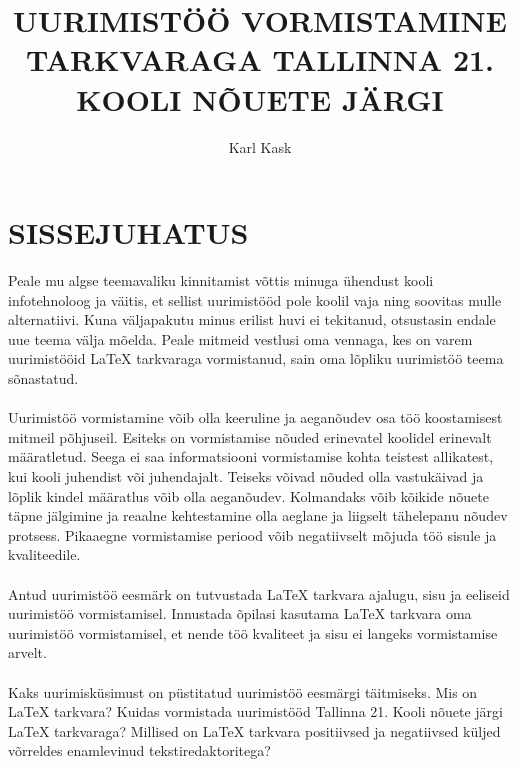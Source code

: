 \documentclass{21kuur}
\title{UURIMISTÖÖ VORMISTAMINE \latex TARKVARAGA TALLINNA 21. KOOLI NÕUETE JÄRGI}
\author{Karl Kask}
\begin{document}
\maketitle
\tableofcontents

\newpage
\chapter*{SISSEJUHATUS}
Peale mu algse teemavaliku kinnitamist võttis minuga ühendust kooli infotehnoloog ja väitis, et sellist uurimistööd pole koolil vaja ning soovitas mulle alternatiivi. Kuna väljapakutu minus erilist huvi ei tekitanud, otsustasin endale uue teema välja mõelda. Peale mitmeid vestlusi oma vennaga, kes on varem uurimistööid LaTeX tarkvaraga vormistanud, sain oma lõpliku uurimistöö teema sõnastatud.
\\\\Uurimistöö vormistamine võib olla keeruline ja aeganõudev osa töö koostamisest mitmeil põhjuseil. Esiteks on vormistamise nõuded erinevatel koolidel erinevalt määratletud. Seega ei saa informatsiooni vormistamise kohta teistest allikatest, kui kooli juhendist või juhendajalt. Teiseks võivad nõuded olla vastukäivad ja lõplik kindel määratlus võib olla aeganõudev. Kolmandaks võib kõikide nõuete täpne jälgimine ja reaalne kehtestamine olla aeglane ja liigselt tähelepanu nõudev protsess. Pikaaegne vormistamise periood võib negatiivselt mõjuda töö sisule ja kvaliteedile.
\\\\Antud uurimistöö eesmärk on tutvustada LaTeX tarkvara ajalugu, sisu ja eeliseid uurimistöö vormistamisel. Innustada õpilasi kasutama LaTeX tarkvara oma uurimistöö vormistamisel, et nende töö kvaliteet ja sisu ei langeks vormistamise arvelt. 
\\\\Kaks uurimisküsimust on püstitatud uurimistöö eesmärgi täitmiseks. Mis on LaTeX tarkvara? Kuidas vormistada uurimistööd Tallinna 21. Kooli nõuete järgi LaTeX tarkvaraga? Millised on LaTeX tarkvara positiivsed ja negatiivsed küljed võrreldes enamlevinud tekstiredaktoritega?
\newpage
\end{document}
